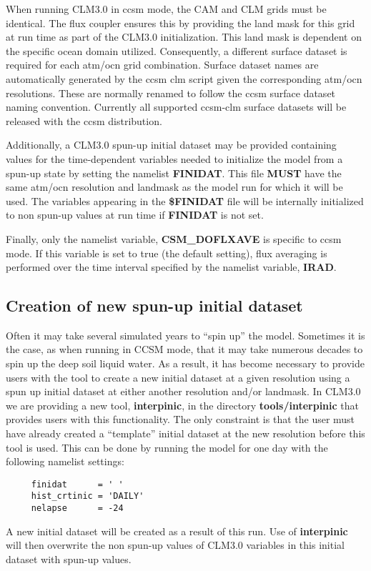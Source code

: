 When running CLM3.0 in ccsm mode, the CAM and CLM grids must be
identical. The flux coupler ensures this by providing the land mask
for this grid at run time as part of the CLM3.0 initialization. This
land mask is dependent on the specific ocean domain utilized.
Consequently, a different surface dataset is required for each atm/ocn
grid combination.  Surface dataset names are automatically generated
by the ccsm clm script given the corresponding atm/ocn
resolutions. These are normally renamed to follow the ccsm surface
dataset naming convention. Currently all supported ccsm-clm surface
datasets will be released with the ccsm distribution.

Additionally, a CLM3.0 spun-up initial dataset may be provided
containing values for the time-dependent variables needed to
initialize the model from a spun-up state by setting the namelist {\bf
FINIDAT}. This file {\bf MUST} have the same atm/ocn resolution and
landmask as the model run for which it will be used.  The variables
appearing in the {\bf \$FINIDAT} file will be internally initialized to non
spun-up values at run time if {\bf FINIDAT} is not set.

Finally, only the namelist variable, {\bf CSM\_DOFLXAVE} is specific
to ccsm mode. If this variable is set to true (the default setting),
flux averaging is performed over the time interval specified by the
namelist variable, {\bf IRAD}.

\subsection {Creation of new spun-up initial dataset}
\label{subsec_interpinic}

Often it may take several simulated years to ``spin up'' the model.
Sometimes it is the case, as when running in CCSM mode, that it may take
numerous decades to spin up the deep soil liquid water. As a result, it
has become necessary to provide users with the tool to create a new
initial dataset at a given resolution using a spun up initial dataset
at either another resolution and/or landmask. In CLM3.0 we are
providing a new tool, {\bf interpinic}, in the directory {\bf
tools/interpinic} that provides users with this functionality.  The
only constraint is that the user must have already created a
``template'' initial dataset at the new resolution before this tool is
used. This can be done by running the model for one day with the
following namelist settings:

\begin{verbatim}
     finidat      = ' '
     hist_crtinic = 'DAILY'
     nelapse      = -24
\end{verbatim}

\noindent
A new initial dataset will be created as a result of this run.  Use of
{\bf interpinic} will then overwrite the non spun-up values of CLM3.0
variables in this initial dataset with spun-up values.
